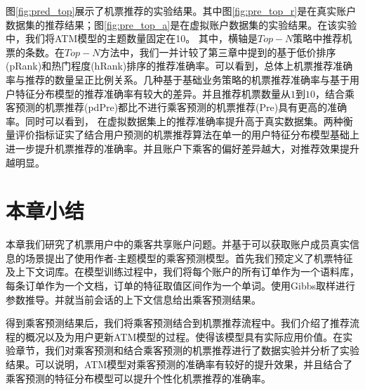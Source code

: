 \begin{figure}
\centering
{}
\end{figure}

图\ref{fig:pred_top}展示了机票推荐的实验结果。其中图\ref{fig:pre_top_r}是在真实账户数据集的推荐结果；图\ref{fig:pre_top_a}是在虚拟账户数据集的实验结果。在该实验中，我们将ATM模型的主题数量固定在10。
其中，横轴是$Top-N$策略中推荐机票的条数。在$Top-N$方法中，我们一并计较了第三章中提到的基于低价排序(pRank)和热门程度(hRank)排序的推荐准确率。可以看到，总体上机票推荐准确率与推荐的数量呈正比例关系。几种基于基础业务策略的机票推荐准确率与基于用户特征分布模型的推荐准确率有较大的差异。并且推荐机票数量从$1$到$10$，结合乘客预测的机票推荐(pdPre)都比不进行乘客预测的机票推荐(Pre)具有更高的准确率。同时可以看到，
在虚拟数据集上的推荐准确率提升高于真实数据集。两种衡量评价指标证实了结合用户预测的机票推荐算法在单一的用户特征分布模型基础上进一步提升机票推荐的准确率。并且账户下乘客的偏好差异越大，对推荐效果提升越明显。


\section{本章小结}

本章我们研究了机票用户中的乘客共享账户问题。并基于可以获取账户成员真实信息的场景提出了使用作者-主题模型的乘客预测模型。首先我们预定义了机票特征及上下文词库。在模型训练过程中，我们将每个账户的所有订单作为一个语料库，每条订单作为一个文档，订单的特征取值区间作为一个单词。使用Gibbs取样进行参数推导。并就当前会话的上下文信息给出乘客预测结果。

得到乘客预测结果后，我们将乘客预测结合到机票推荐流程中。我们介绍了推荐流程的概况以及为用户更新ATM模型的过程。使得该模型具有实际应用价值。在实验章节，我们对乘客预测和结合乘客预测的机票推荐进行了数据实验并分析了实验结果。可以说明，ATM模型对乘客预测的准确率有较好的提升效果，并且结合了乘客预测的特征分布模型可以提升个性化机票推荐的准确率。